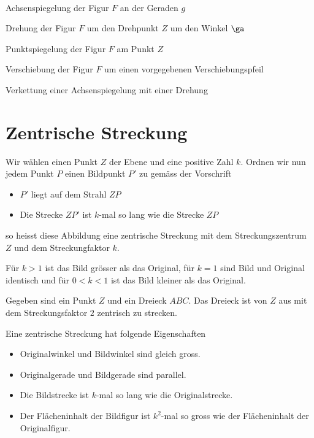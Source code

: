 \documentclass[%
11pt,%
twoside,%
titlepage,%
a4page,%
headsepline%
]{scrartcl}
\begin{document}
\begin{bsps}
\ \\[-2ex]
\begin{enumeratea}
\item Achsenspiegelung der Figur $F$ an der Geraden $g$%
\item Drehung der Figur $F$ um den Drehpunkt $Z$ um den Winkel $\ga$%
\item Punktspiegelung der Figur $F$ am Punkt $Z$%
\item Verschiebung der Figur $F$ um einen vorgegebenen Verschiebungspfeil%
\item Verkettung einer Achsenspiegelung mit einer Drehung
\end{enumeratea}
\end{bsps}

\section{Zentrische Streckung}
Wir w\"ahlen einen Punkt $Z$ der Ebene und eine positive Zahl $k$. Ordnen wir nun jedem Punkt $P$ einen Bildpunkt $P'$ zu gem\"ass der Vorschrift
\begin{itemize}
\item $P'$ liegt auf dem Strahl $ZP$
\item Die Strecke $ZP'$ ist $k$-mal so lang wie die Strecke $ZP$
\end{itemize}
so heisst diese Abbildung eine zentrische Streckung mit dem Streckungszentrum $Z$ und dem Streckungfaktor $k$.%

F\"ur $k>1$ ist das Bild gr\"osser als das Original, f\"ur $k=1$ sind Bild und Original identisch und f\"ur $0<k<1$ ist das Bild kleiner als das Original.

\begin{bsp} Gegeben sind ein Punkt $Z$ und ein Dreieck $ABC$. Das Dreieck ist von $Z$ aus mit dem Streckungsfaktor $2$ zentrisch zu strecken.%
\end{bsp}
Eine zentrische Streckung hat folgende Eigenschaften
\begin{itemize}
\item Originalwinkel und Bildwinkel sind gleich gross.
\item Originalgerade und Bildgerade sind parallel.
\item Die Bildstrecke ist $k$-mal so lang wie die Originalstrecke.
\item Der Fl\"acheninhalt der Bildfigur ist $k^2$-mal so gross wie der Fl\"acheninhalt der Originalfigur.
\end{itemize}
\end{document}
